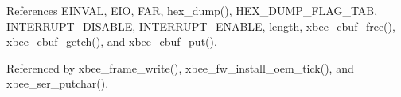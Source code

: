References E\-I\-N\-V\-A\-L, E\-I\-O, F\-A\-R, hex\-\_\-dump(), H\-E\-X\-\_\-\-D\-U\-M\-P\-\_\-\-F\-L\-A\-G\-\_\-\-T\-A\-B, I\-N\-T\-E\-R\-R\-U\-P\-T\-\_\-\-D\-I\-S\-A\-B\-L\-E, I\-N\-T\-E\-R\-R\-U\-P\-T\-\_\-\-E\-N\-A\-B\-L\-E, length, xbee\-\_\-cbuf\-\_\-free(), xbee\-\_\-cbuf\-\_\-getch(), and xbee\-\_\-cbuf\-\_\-put().



Referenced by xbee\-\_\-frame\-\_\-write(), xbee\-\_\-fw\-\_\-install\-\_\-oem\-\_\-tick(), and xbee\-\_\-ser\-\_\-putchar().

